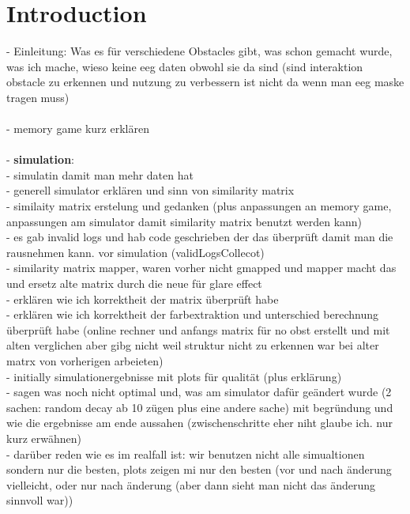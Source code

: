 
\chapter{Introduction}
\label{sec:intro}

\newpage

- Einleitung: Was es für verschiedene Obstacles gibt, was schon gemacht wurde, was ich mache, wieso keine eeg daten obwohl sie da sind (sind interaktion obstacle zu erkennen und nutzung zu verbessern ist nicht da wenn man eeg maske tragen muss)\\\\
- memory game kurz erklären\\\\
- \textbf{simulation}:\\
- simulatin damit man mehr daten hat\\
- generell simulator erklären und sinn von similarity matrix\\
- similaity matrix erstelung und gedanken (plus anpassungen an memory game, anpassungen am simulator damit similarity matrix benutzt werden kann)\\
- es gab invalid logs und hab code geschrieben der das überprüft damit man die rausnehmen kann. vor simulation (validLogsCollecot)\\
- similarity matrix mapper, waren vorher nicht gmapped und mapper macht das und ersetz alte matrix durch die neue für glare effect\\
- erklären wie ich korrektheit der matrix überprüft habe\\
- erklären wie ich korrektheit der farbextraktion und unterschied berechnung überprüft habe (online rechner und anfangs matrix für no obst erstellt und mit alten verglichen aber gibg nicht weil struktur nicht zu erkennen war bei alter matrx von vorherigen arbeieten)\\
- initially simulationergebnisse mit plots für qualität (plus erklärung)\\
- sagen was noch nicht optimal und, was am simulator dafür geändert wurde (2 sachen: random decay ab 10 zügen plus eine andere sache) mit begründung und wie die ergebnisse am ende aussahen (zwischenschritte eher niht glaube ich. nur kurz erwähnen)\\
- darüber reden wie es im realfall ist: wir benutzen nicht alle simualtionen sondern nur die besten, plots zeigen mi nur den besten (vor und nach änderung vielleicht, oder nur nach änderung (aber dann sieht man nicht das änderung sinnvoll war))\\
